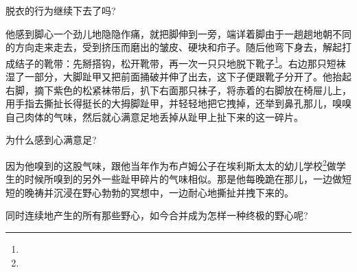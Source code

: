 \par 脱衣的行为继续下去了吗?
\par 他感到脚心一个劲儿地隐隐作痛，就把脚伸到一旁，端详着脚由于一趟趟地朝不同的方向走来走去，受到挤压而磨出的皱皮、硬块和疖子。随后他弯下身去，解起打成结子的靴带：先掰搭钩，松开靴带，再一次一只只地脱下靴子\footnote{}。右边那只短袜湿了一部分，大脚趾甲又把前面捅破并伸了出去，这下子便跟靴子分开了。他抬起右脚，摘下紫色的松紧袜带后，扒下右面那只袜子，将赤着的右脚放在椅屉儿上，用手指去撕扯长得挺长的大拇脚趾甲，并轻轻地把它拽掉，还举到鼻孔那儿，嗅嗅自己肉体的气味，然后就心满意足地丢掉从趾甲上扯下来的这一碎片。
\par 为什么感到心满意足?
\par 因为他嗅到的这股气味，跟他当年作为布卢姆公子在埃利斯太太的幼儿学校\footnote{}做学生的时候所嗅到的另外一些趾甲碎片的气味相似。那是他每晚跪在那儿，一边做短短的晚祷并沉浸在野心勃勃的冥想中，一边耐心地撕扯并拽下来的。
\par 同时连续地产生的所有那些野心，如今合并成为怎样一种终极的野心呢?
